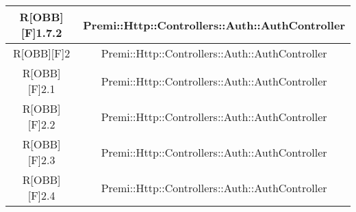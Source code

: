 \begin{table}[h]
\begin{center}
\begin{tabular}{|c|c|}
		\midrule
			R[OBB][F]1.7.2 & Premi::Http::Controllers::Auth::AuthController\\
		\midrule
			R[OBB][F]2 & Premi::Http::Controllers::Auth::AuthController\\
		\midrule
			R[OBB][F]2.1 & Premi::Http::Controllers::Auth::AuthController\\
		\midrule
			R[OBB][F]2.2 & Premi::Http::Controllers::Auth::AuthController\\
		\midrule
			R[OBB][F]2.3 & Premi::Http::Controllers::Auth::AuthController\\
		\midrule
			R[OBB][F]2.4 & Premi::Http::Controllers::Auth::AuthController\\
		\bottomrule
		\end{tabular}
	\end{center}
\end{table}



